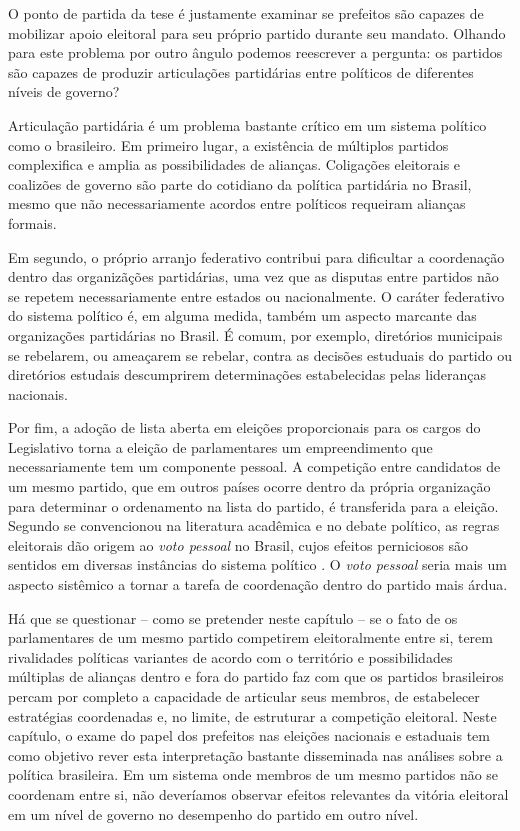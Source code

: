 O ponto de partida da tese é justamente examinar se prefeitos são capazes de mobilizar apoio eleitoral para seu próprio partido durante seu mandato. Olhando para este problema por outro ângulo podemos reescrever a pergunta: os partidos são capazes de produzir articulações partidárias entre políticos de diferentes níveis de governo?

Articulação partidária é um problema bastante crítico em um sistema político como o brasileiro. Em primeiro lugar, a existência de múltiplos partidos complexifica e amplia as possibilidades de alianças. Coligações eleitorais e coalizões de governo são parte do cotidiano da política partidária no Brasil, mesmo que não necessariamente acordos entre políticos requeiram alianças formais.

Em segundo, o próprio arranjo federativo contribui para dificultar a coordenação dentro das organizãções partidárias, uma vez que as disputas entre partidos não se repetem necessariamente entre estados ou nacionalmente. O caráter federativo do sistema político é, em alguma medida, também um aspecto marcante das organizações partidárias no Brasil. É comum, por exemplo, diretórios municipais se rebelarem, ou ameaçarem se rebelar, contra as decisões estuduais do partido ou diretórios estudais descumprirem determinações estabelecidas pelas lideranças nacionais.

Por fim, a adoção de lista aberta em eleições proporcionais para os cargos do Legislativo torna a eleição de parlamentares um empreendimento que necessariamente tem um componente pessoal. A competição entre candidatos de um mesmo partido, que em outros países ocorre dentro da própria organização para determinar o ordenamento na lista do partido, é transferida para a eleição. Segundo se convencionou na literatura acadêmica e no debate político, as regras eleitorais dão origem ao \emph{voto pessoal} no Brasil, cujos efeitos perniciosos são sentidos em diversas instâncias do sistema político \citep*{Ames1995,Ames1995a,Ames2001,Carey1995,Mainwaring1991,Mainwaring1999}. O \emph{voto pessoal} seria mais um aspecto sistêmico a tornar a tarefa de coordenação dentro do partido mais árdua. 

Há que se questionar -- como se pretender neste capítulo -- se o fato de os parlamentares de um mesmo partido competirem eleitoralmente entre si, terem rivalidades políticas variantes de acordo com o território e possibilidades múltiplas de alianças dentro e fora do partido faz com que os partidos brasileiros percam por completo a capacidade de articular seus membros, de estabelecer estratégias coordenadas e, no limite, de estruturar a competição eleitoral. Neste capítulo, o exame do papel dos prefeitos nas eleições nacionais e estaduais tem como objetivo rever esta interpretação bastante disseminada nas análises sobre a política brasileira. Em um sistema onde membros de um mesmo partidos não se coordenam entre si, não deveríamos observar efeitos relevantes da vitória eleitoral em um nível de governo no desempenho do partido em outro nível.


